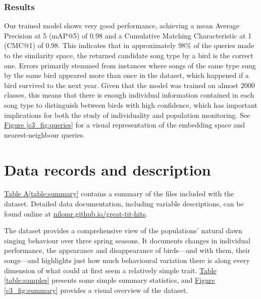 \subsubsection{Results}
Our trained model shows very good performance, achieving a mean Average Precision at 5 (mAP@5) of 0.98 and a Cumulative Matching Characteristic at 1 (CMC@1) of 0.98. This indicates that in approximately 98\% of the queries made to the similarity space, the returned candidate song type by a bird is the correct one. Errors primarily stemmed from instances where songs of the same type sung by the same bird appeared more than once in the dataset, which happened if a bird survived to the next year. Given that the model was trained on almost 2000 classes, this means that there is enough individual information contained in each song type to distinguish between birds with high confidence, which has important implications for both the study of individuality and population monitoring. See \hyperref[c3_fig:queries]{Figure \ref*{c3_fig:queries}} for a visual representation of the embedding space and nearest-neighbour queries.

\section{Data records and description}

\hyperref[table:summary]{Table A\ref*{table:summary}} contains a summary of the files included with the dataset. Detailed data documentation, including variable descriptions, can be found online at \href{https://nilomr.github.io/great-tit-hits/}{nilomr.github.io/great-tit-hits}.

The dataset provides a comprehensive view of the populations' natural dawn singing behaviour over three spring seasons. It documents changes in individual performance, the appearance and disappearance of birds---and with them, their songs---and highlights just how much behavioural variation there is along every dimension of what could at first seem a relatively simple trait. \hyperref[table:samples]{Table \ref*{table:samples}} presents some simple summary statistics, and \hyperref[c3_fig:summary]{Figure \ref*{c3_fig:summary}} provides a visual overview of the dataset.

